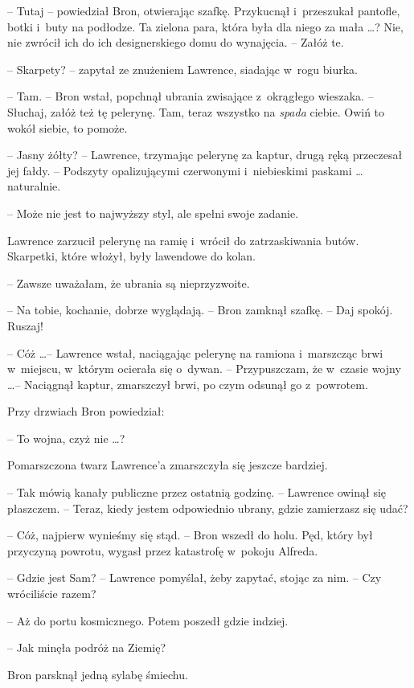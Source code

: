\documentclass[oneside,polish,11pt,rmheadings]{mwbk}
\begin{document}
-- Tutaj -- powiedział Bron, otwierając szafkę. Przykucnął i~przeszukał pantofle, botki i~buty na podłodze. Ta zielona para, która była dla niego za mała \ldots ? Nie, nie zwrócił ich do ich designerskiego domu do wynajęcia. -- Załóż te.  

-- Skarpety? -- zapytał ze znużeniem Lawrence, siadając w~rogu biurka. 

-- Tam. -- Bron wstał, popchnął ubrania zwisające z~okrągłego wieszaka. -- Słuchaj, załóż też tę pelerynę. Tam, teraz wszystko na \textit{spada }ciebie. Owiń to wokół siebie, to pomoże. 

-- Jasny żółty? --  Lawrence, trzymając pelerynę za kaptur, drugą ręką przeczesał jej fałdy. -- Podszyty opalizującymi czerwonymi i~niebieskimi paskami \ldots  naturalnie. 

-- Może nie jest to najwyższy styl, ale spełni swoje zadanie. 

Lawrence zarzucił pelerynę na ramię i~wrócił do zatrzaskiwania butów. Skarpetki, które włożył, były lawendowe do kolan.

-- Zawsze uważałam, że ubrania są nieprzyzwoite. 

-- Na tobie, kochanie, dobrze wyglądają. -- Bron zamknął szafkę. -- Daj spokój. Ruszaj! 

-- Cóż \ldots  -- Lawrence wstał, naciągając pelerynę na ramiona i~marszcząc brwi w~miejscu, w~którym ocierała się o~dywan. -- Przypuszczam, że w~czasie wojny \ldots  -- Naciągnął kaptur, zmarszczył brwi, po czym odsunął go z~powrotem. 

Przy drzwiach Bron powiedział: 

 -- To wojna, czyż nie \ldots ? 

Pomarszczona twarz Lawrence'a zmarszczyła się jeszcze bardziej. 

-- Tak mówią kanały publiczne przez ostatnią godzinę. -- Lawrence owinął się płaszczem. -- Teraz, kiedy jestem odpowiednio ubrany, gdzie zamierzasz się udać? 

-- Cóż, najpierw wynieśmy się stąd. -- Bron wszedł do holu. Pęd, który był przyczyną powrotu, wygasł przez katastrofę w~pokoju Alfreda. 

-- Gdzie jest Sam? --  Lawrence pomyślał, żeby zapytać, stojąc za nim. -- Czy wróciliście razem? 

-- Aż do portu kosmicznego. Potem poszedł gdzie indziej. 

-- Jak minęła podróż na Ziemię? 

Bron parsknął jedną sylabę śmiechu. 
\end{document}
